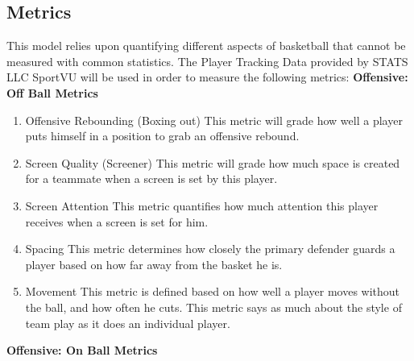 \documentclass{article}
\begin{document}
\subsection{Metrics}
This model relies upon quantifying different aspects of basketball that cannot be measured with common statistics.  The Player Tracking Data provided by STATS LLC SportVU will be used in order to measure the following metrics:
\newline
\newline
\noindent \textbf{Offensive: Off Ball Metrics}

\begin{enumerate}[nolistsep]%
\item Offensive Rebounding (Boxing out)
\subitem This metric will grade how well a player puts himself in a position to
\subitem grab an offensive rebound.
\item Screen Quality (Screener)
\subitem This metric will grade how much space is created for a teammate
\subitem when a screen is set by this player.
\item Screen Attention
\subitem This metric quantifies how much attention this player receives when 
\subitem a screen is set for him.
\item Spacing
\subitem This metric determines how closely the primary defender guards a
\subitem player based on how far away from the basket he is.
\item Movement
\subitem This metric is defined based on how well a player moves without the 
\subitem ball, and how often he cuts.  This metric says as much about the
\subitem style of team play as it does an individual player.
\end{enumerate}
\noindent \textbf{Offensive: On Ball Metrics}
\end{document}

